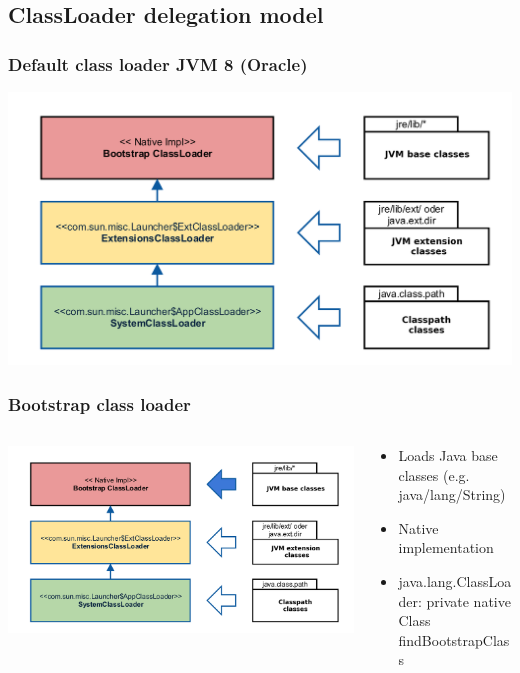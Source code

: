 \documentclass[aspectratio=169]{beamer}
\begin{document}
\subsection{ClassLoader delegation model}

\begin{frame}
	\frametitle{Default class loader JVM 8 (Oracle)}
	\includegraphics[scale=0.1]{assets/classloader-hierachie.png} 
\end{frame}

\begin{frame}
	\frametitle{Bootstrap class loader}
	\begin{columns}[T] 
		\begin{column}{.46\textwidth}
			\includegraphics[scale=0.06]{assets/classloader-hierachie-bootstrap-active.png}
		\end{column}
		\hfill
		\begin{column}{.56\textwidth}

		\begin{itemize}
			\item{Loads Java base classes (e.g. java/lang/String)}
			\item{Native implementation}
			\item{java.lang.ClassLoader: private native Class findBootstrapClass}
		\end{itemize}

		\end{column}
	\end{columns}
\end{frame}
\end{document}
